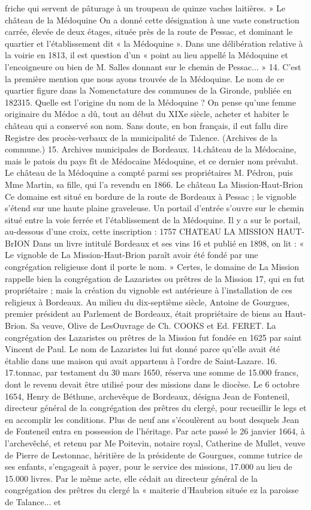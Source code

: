 friche qui servent de pâturage à un troupeau de quinze vaches laitières. » Le château de la Médoquine On a donné cette désignation à une vaste construction carrée, élevée de deux étages, située près de la route de Pessac, et dominant le quartier et l'établissement dit « la Médoquine ». Dans une délibération relative à la voirie en 1813, il est question d'un « point au lieu appellé la Médoquine et l'encoigneure ou bien de M. Salles donnant sur le chemin de Pessac... » 14. C'est la première mention que nous ayons trouvée de la Médoquine. Le nom de ce quartier figure dans la Nomenctature des communes de la Gironde, publiée en 182315. Quelle est l'origine du nom de la Médoquine ? On pense qu'une femme originaire du Médoc a dû, tout au début du XIXe siècle, acheter et habiter le château qui a conservé son nom. Sans doute, en bon français, il eut fallu dire Registre des procès-verbaux de la municipalité de Talence. (Archives de la commune.) 15. Archives municipales de Bordeaux. 14.château de la Médocaine, mais le patois du pays fît de Médocaine Médoquine, et ce dernier nom prévalut. Le château de la Médoquine a compté parmi ses propriétaires M. Pédron, puis Mme Martin, sa fille, qui l'a revendu en 1866. Le château La Mission-Haut-Brion Ce domaine est situé en bordure de la route de Bordeaux à Pessac ; le vignoble s'étend sur une haute plaine graveleuse. Un portail d'entrée s'ouvre sur le chemin situé entre la voie ferrée et l'établissement de la Médoquine. Il y a sur le portail, au-dessous d'une croix, cette inscription : 1757 CHATEAU LA MISSION HAUT-BrION Dans un livre intitulé Bordeaux et ses vins 16 et publié en 1898, on lit : « Le vignoble de La Mission-Haut-Brion paraît avoir été fondé par une congrégation religieuse dont il porte le nom. » Certes, le domaine de La Mission rappelle bien la congrégation de Lazaristes ou prêtres de la Mission 17, qui en fut propriétaire ; mais la création du vignoble est antérieure à l'installation de ces religieux à Bordeaux. Au milieu du dix-septième siècle, Antoine de Gourgues, premier président au Parlement de Bordeaux, était propriétaire de biens au Haut-Brion. Sa veuve, Olive de LesOuvrage de Ch. COOKS et Ed. FERET. La congrégation des Lazaristes ou prêtres de la Mission fut fondée en 1625 par saint Vincent de Paul. Le nom de Lazaristes lui fut donné parce qu'elle avait été établie dans une maison qui avait appartenu à l'ordre de Saint-Lazare. 16. 17.tonnac, par testament du 30 mars 1650, réserva une somme de 15.000 francs, dont le revenu devait être utilisé pour des missions dans le diocèse. Le 6 octobre 1654, Henry de Béthune, archevêque de Bordeaux, désigna Jean de Fonteneil, directeur général de la congrégation des prêtres du clergé, pour recueillir le legs et en accomplir les conditions. Plus de neuf ans s'écoulèrent au bout desquels Jean de Fonteneil entra en possession de l'héritage. Par acte passé le 26 janvier 1664, à l'archevêché, et retenu par Me Poitevin, notaire royal, Catherine de Mullet, veuve de Pierre de Lestonnac, héritière de la présidente de Gourgues, comme tutrice de ses enfants, s'engageait à payer, pour le service des missions, 17.000 au lieu de 15.000 livres. Par le même acte, elle cédait au directeur général de la congrégation des prêtres du clergé la « maiterie d'Haubrion située ez la paroisse de Talance... et 
